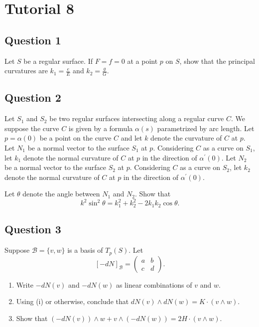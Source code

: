 \documentclass[12pt, a4paper]{article}
\begin{document}
\section*{Tutorial 8}

\subsection*{Question 1}
Let $S$ be a regular surface. If $F=f=0$ at a point $p$ on $S$, show that the principal curvatures are $k_{1}=\frac{e}{E}$ and $k_{2}=\frac{g}{G}$.
\newpage

\subsection*{Question 2}
Let $S_{1}$ and $S_{2}$ be two regular surfaces intersecting along a regular curve $C$. We suppose the curve $C$ is given by a formula $\alpha(s)$ parametrized by arc length. Let $p=\alpha(0)$ be a point on the curve $C$ and let $k$ denote the curvature of $C$ at $p$. Let $N_{1}$ be a normal vector to the surface $S_{1}$ at $p$. Considering $C$ as a curve on $S_{1}$, let $k_{1}$ denote the normal curvature of $C$ at $p$ in the direction of $\alpha^{\prime}(0)$. Let $N_{2}$ be a normal vector to the surface $S_{2}$ at $p$. Considering $C$ as a curve on $S_{2}$, let $k_{2}$ denote the normal curvature of $C$ at $p$ in the direction of $\alpha^{\prime}(0)$.

Let $\theta$ denote the angle between $N_{1}$ and $N_{2}$. Show that
\[ k^{2}\sin^{2}\theta=k_{1}^{2}+k_{2}^{2}-2k_{1}k_{2}\cos\theta. \]
\newpage

\subsection*{Question 3}
Suppose $\mathcal{B}=\{v,w\}$ is a basis of $T_{p}(S)$. Let
\[ [-dN]_{\mathcal{B}}=\begin{pmatrix}a&b\\ c&d\end{pmatrix}. \]
\begin{enumerate}[label=(\roman*)]
    \item Write $-dN(v)$ and $-dN(w)$ as linear combinations of $v$ and $w$.
    \item Using (i) or otherwise, conclude that $dN(v)\wedge dN(w)=K\cdot (v\wedge w)$.
    \item Show that $(-dN(v))\wedge w+v\wedge(-dN(w))=2H\cdot (v\wedge w)$.
\end{enumerate}
\newpage
\end{document}
